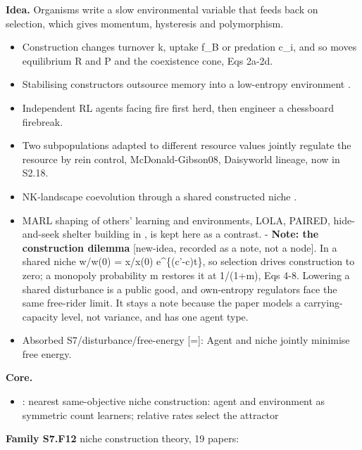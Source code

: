 \documentclass[10pt]{article}
\newcommand{\memb}[1]{\par\smallskip\textbf{#1}\quad}
\begin{document}
\textbf{Idea.} Organisms write a slow environmental variable that feeds back on selection, which gives momentum, hysteresis and polymorphism.
\begin{itemize}[nosep,leftmargin=1.2em]
\item Construction changes turnover k, uptake f\_B or predation c\_i, and so moves equilibrium R and P and the coexistence cone, \citet{Kylafis-niche10} Eqs 2a-2d.
\item Stabilising constructors outsource memory into a low-entropy environment \citep{Lee-outsourcing22}.
\item Independent RL agents facing fire first herd, then engineer a chessboard firebreak.
\item Two subpopulations adapted to different resource values jointly regulate the resource by rein control, McDonald-Gibson08, Daisyworld lineage, now in S2.18.
\item NK-landscape coevolution through a shared constructed niche \citep{SuzukiArita-coevolution13}.
\item MARL shaping of others' learning and environments, LOLA, PAIRED, hide-and-seek shelter building in \citet{Baker-emergent20}, is kept here as a contrast. - \textbf{Note: the construction dilemma} [new-idea, recorded as a note, not a node]. In a shared niche w/w(0) = x/x(0) e\^{}\{(c'-c)t\}, so selection drives construction to zero; a monopoly probability m restores it at 1/(1+m), \citet{Krakauer-diversity09} Eqs 4-8. Lowering a shared disturbance is a public good, and own-entropy regulators face the same free-rider limit. It stays a note because the paper models a carrying-capacity level, not variance, and has one agent type.
\item Absorbed S7/disturbance/free-energy [=]: Agent and niche jointly minimise free energy.
\end{itemize}


\memb{Core.}
\begin{itemize}[nosep,leftmargin=1.2em]
\item \citet{Bruineberg-free18}: nearest same-objective niche construction: agent and environment as symmetric count learners; relative rates select the attractor
\end{itemize}
\memb{Family S7.F12} niche construction theory, 19 papers: {\footnotesize \citetext{\citealp{OdlingSmee-niche96}; \citealp{Laland-evolutionary99}; \citealp{OdlingSmee-niche03}; \citealp{Krakauer-diversity09}; \citealp{Kylafis-niche10}; \citealp{Jones-organisms94}\dag; \citealp{Laland-evolutionary96}; \citealp{Taylor-niche04}\dag; \citealp{Laland-perspective06}; \citealp{Erwin-macroevolution08}; \citealp{Kylafis-ecological08}; \citealp{Lehmann-adaptive08}; \citealp{Zhang-organism12}; \citealp{SuzukiArita-coevolution13}; \citealp{Han-symmetry16}; \citealp{Laland-introduction16}; \citealp{Yeakel-diverse20}; \citealp{Nisioti-dynamics23}; \citealp{Wang-stability25}}}
\end{document}

